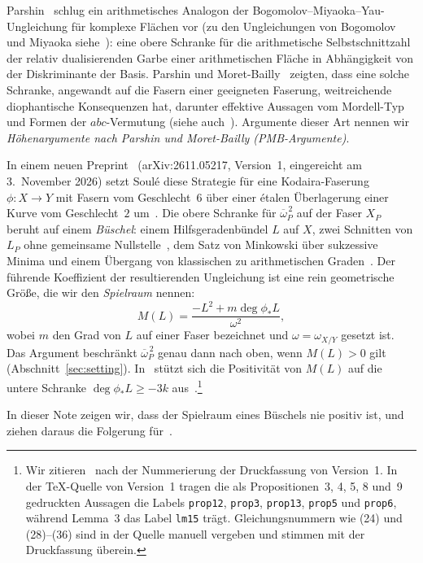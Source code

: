 \documentclass[11pt]{article}
\theoremstyle{definition}
\theoremstyle{remark}
\newcommand{\ob}{\overline{\omega}}
\begin{document}
Parshin~\cite{Pa88} schlug ein arithmetisches Analogon der
Bogomolov--Miyaoka--Yau-Ungleichung für komplexe Flächen vor (zu den
Ungleichungen von Bogomolov und Miyaoka siehe~\cite{Bo78,Mi77}): eine obere
Schranke für die arithmetische Selbstschnittzahl der relativ dualisierenden Garbe
einer arithmetischen Fläche in Abhängigkeit von der Diskriminante der Basis.
Parshin und Moret-Bailly~\cite{Pa88,MB90} zeigten, dass eine solche Schranke,
angewandt auf die Fasern einer geeigneten Faserung, weitreichende diophantische
Konsequenzen hat, darunter effektive Aussagen vom Mordell-Typ und Formen der
$abc$-Vermutung (siehe auch~\cite{So05}). Argumente dieser Art nennen wir
\emph{Höhenargumente nach Parshin und Moret-Bailly (PMB-Argumente)}.

In einem neuen Preprint~\cite{So26} (arXiv:2611.05217, Version~1, eingereicht am
3.~November 2026) setzt Soul\'e diese Strategie für eine Kodaira-Faserung
$\phi\colon X\to Y$ mit Fasern vom Geschlecht~$6$ über einer étalen Überlagerung
einer Kurve vom Geschlecht~$2$ um~\cite{Ko67,MD85}. Die obere Schranke für
$\ob_P^{\,2}$ auf der Faser $X_P$ beruht auf einem \emph{Büschel}: einem
Hilfsgeradenbündel $L$ auf $X$, zwei Schnitten von $L_P$ ohne gemeinsame
Nullstelle~\cite[Prop.~3]{So26}, dem Satz von Minkowski über sukzessive Minima
und einem Übergang von klassischen zu arithmetischen Graden~\cite[Cor.~1]{So26}.
Der führende Koeffizient der resultierenden Ungleichung ist eine rein geometrische
Größe, die wir den \emph{Spielraum} nennen:
\begin{equation}\label{eq:margin-intro}
M(L)=\frac{-L^2+m\deg\phi_*L}{\omega^2},
\end{equation}
wobei $m$ den Grad von $L$ auf einer Faser bezeichnet und $\omega=\omega_{X/Y}$
gesetzt ist. Das Argument beschränkt $\ob_P^{\,2}$ genau dann nach oben, wenn
$M(L)>0$ gilt (Abschnitt~\ref{sec:setting}). In~\cite{So26} stützt sich die
Positivität von $M(L)$ auf die untere Schranke $\deg\phi_*L\ge -3k$
aus~\cite[Prop.~9\,vi)]{So26}.\footnote{Wir zitieren~\cite{So26} nach der
Nummerierung der Druckfassung von Version~1. In der \TeX-Quelle von Version~1
tragen die als Propositionen~3, 4, 5, 8 und~9 gedruckten Aussagen die Labels
\texttt{prop12}, \texttt{prop3}, \texttt{prop13}, \texttt{prop5} und
\texttt{prop6}, während Lemma~3 das Label \texttt{lm15} trägt. Gleichungsnummern
wie (24) und (28)--(36) sind in der Quelle manuell vergeben und stimmen mit der
Druckfassung überein.}

In dieser Note zeigen wir, dass der Spielraum eines Büschels nie positiv ist, und
ziehen daraus die Folgerung für~\cite{So26}.
\end{document}
